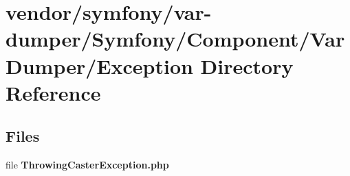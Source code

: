 \section{vendor/symfony/var-\/dumper/\+Symfony/\+Component/\+Var\+Dumper/\+Exception Directory Reference}
\label{dir_75113fc53c328317c623679f410878f6}
\subsection*{Files}
\begin{DoxyCompactItemize}
\item 
file {\bf Throwing\+Caster\+Exception.\+php}
\end{DoxyCompactItemize}
